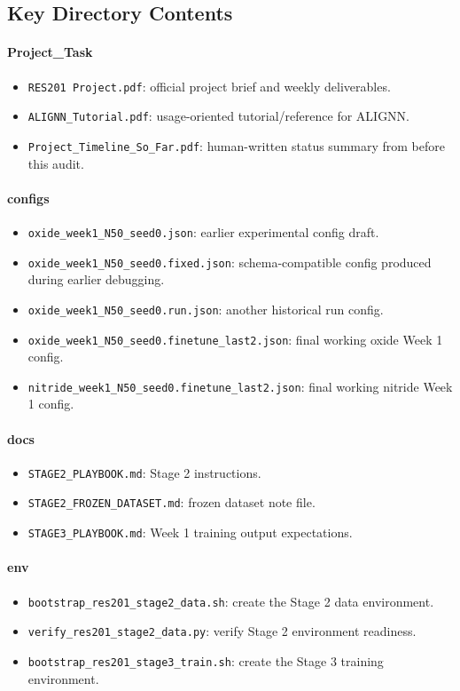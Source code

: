 \documentclass[11pt]{article}
\begin{document}
\subsection{Key Directory Contents}
\paragraph{Project\_Task}
\begin{itemize}
  \item \texttt{RES201 Project.pdf}: official project brief and weekly deliverables.
  \item \texttt{ALIGNN\_Tutorial.pdf}: usage-oriented tutorial/reference for ALIGNN.
  \item \texttt{Project\_Timeline\_So\_Far.pdf}: human-written status summary from before this audit.
\end{itemize}

\paragraph{configs}
\begin{itemize}
  \item \texttt{oxide\_week1\_N50\_seed0.json}: earlier experimental config draft.
  \item \texttt{oxide\_week1\_N50\_seed0.fixed.json}: schema-compatible config produced during earlier debugging.
  \item \texttt{oxide\_week1\_N50\_seed0.run.json}: another historical run config.
  \item \texttt{oxide\_week1\_N50\_seed0.finetune\_last2.json}: final working oxide Week 1 config.
  \item \texttt{nitride\_week1\_N50\_seed0.finetune\_last2.json}: final working nitride Week 1 config.
\end{itemize}

\paragraph{docs}
\begin{itemize}
  \item \texttt{STAGE2\_PLAYBOOK.md}: Stage 2 instructions.
  \item \texttt{STAGE2\_FROZEN\_DATASET.md}: frozen dataset note file.
  \item \texttt{STAGE3\_PLAYBOOK.md}: Week 1 training output expectations.
\end{itemize}

\paragraph{env}
\begin{itemize}
  \item \texttt{bootstrap\_res201\_stage2\_data.sh}: create the Stage 2 data environment.
  \item \texttt{verify\_res201\_stage2\_data.py}: verify Stage 2 environment readiness.
  \item \texttt{bootstrap\_res201\_stage3\_train.sh}: create the Stage 3 training environment.
\end{itemize}
\end{document}
